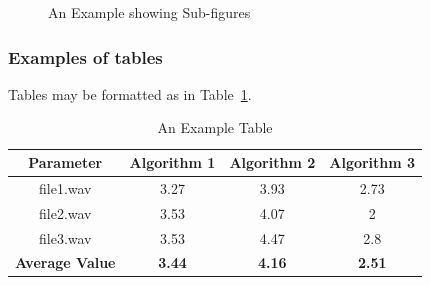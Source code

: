 \begin{figure}[h]
\centerline{
\hfil
{}}
\centerline{
\hfil
{}
}
\caption{An Example showing Sub-figures}
\label{fig:int}
\end{figure}


\subsubsection{Examples of tables}
\indent Tables may be formatted as in Table~\ref{tab:Table}.
\begin{table}[h]
	\renewcommand{\arraystretch}{1.1}
	\caption{An Example Table}
	\label{tab:Table}
	\centering
	\begin{tabular}{|c|c|c|c|}
		\hline
		Parameter 		& Algorithm 1 	&  	Algorithm 2 	& 	Algorithm 3	\\
		\hline

		file1.wav 		& 3.27		&	3.93		&	2.73 		\\
		file2.wav 		& 3.53		&	4.07		&	2		\\
		file3.wav 		& 3.53		&	4.47		&	2.8 		\\ \hline

		\hline 
		\textbf{Average Value}	& \textbf{3.44} &  \textbf{4.16} & \textbf{2.51}\\ \hline
	\end{tabular}
\end{table}


